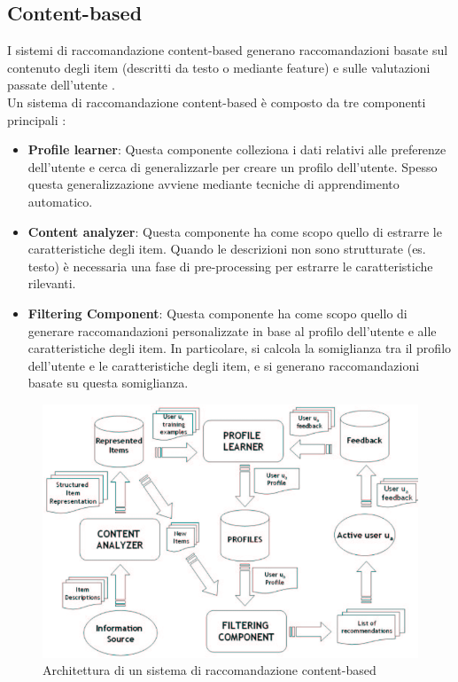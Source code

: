\subsection{Content-based}
I sistemi di raccomandazione content-based generano raccomandazioni basate sul contenuto degli item (descritti da testo o mediante feature) e sulle valutazioni passate dell'utente \cite{Lops2011}.\\
Un sistema di raccomandazione content-based è composto da tre componenti principali \cite{Lops2011}:
\begin{itemize}
    \item \textbf{Profile learner}: Questa componente colleziona i dati relativi alle preferenze dell'utente e cerca di generalizzarle per creare un profilo dell'utente. Spesso questa generalizzazione avviene mediante tecniche di apprendimento automatico.
    \item \textbf{Content analyzer}: Questa componente ha come scopo quello di estrarre le caratteristiche degli item. Quando le descrizioni non sono strutturate (es. testo) è necessaria una fase di pre-processing per estrarre le caratteristiche rilevanti.
    \item \textbf{Filtering Component}: Questa componente ha come scopo quello di generare raccomandazioni personalizzate in base al profilo dell'utente e alle caratteristiche degli item. In particolare, si calcola la somiglianza tra il profilo dell'utente e le caratteristiche degli item, e si generano raccomandazioni basate su questa somiglianza.
\end{itemize}
\begin{figure}[H]
    \centering
    \includegraphics[scale=0.5]{images/contentBasedElementi.png}
    \caption{Architettura di un sistema di raccomandazione content-based}
\end{figure}

